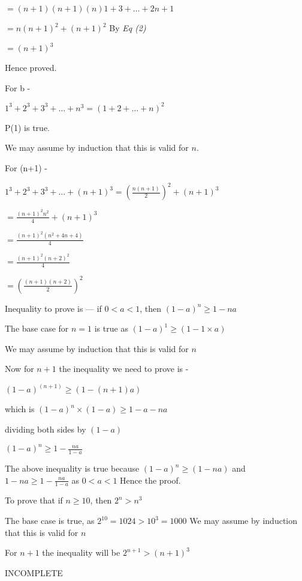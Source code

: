 \documentclass[12pt]{article}
\begin{document}
\begin{enumerate}
\begin{item}
      $ = (n+1)(n+1)(n) 1 + 3 + \dots + 2n+1 $
      
      $ = n(n+1)^{2} + (n+1)^2$ By {\it Eq (2)}
      
      $ = (n+1)^3$

      Hence proved.

      For b -

      $1^3 + 2^3 + 3^3 + \ldots + n^3  = (1+2+\ldots+n)^2$

      P(1) is true.

      We may assume by induction that this is valid for $n$.

      For (n+1) -

      $ 1^3 + 2^3 + 3^3 + ... + (n+1)^3 = (\frac{n(n+1)}{2})^2 + (n+1)^3 $

      $= \frac{(n+1)^2n^2}{4} + (n+1)^3 $

      $= \frac{(n+1)^2(n^2 + 4n + 4)}{4}$

      $= \frac{(n+1)^2(n+2)^2}{4}$

      $ = (\frac{(n+1)(n+2)}{2})^2 $

  \end{item}

  \begin{item}
    Inequality to prove is --- if $0 < a < 1$, then $(1-a)^n \ge 1 - na $
    
    The base case for $n = 1 $ is true as $ (1-a)^{1} \ge (1- 1 \times a) $

    We may assume by induction that this is valid for $n$

    Now for $ n + 1 $ the inequality we need to prove is -
    \begin{center}
      $(1-a)^{(n+1)} \ge (1 - (n+1)a) $

      which is $(1-a)^{n} \times (1-a) \ge 1-a - na $

      dividing both sides by $(1-a)$

      $ (1-a)^n \ge 1 - \frac{na}{1-a}$

      The above inequality is true because $ (1-a)^n \ge (1 -na) $ and $1-na \ge 1 -  \frac{na}{1-a} $ as $0 < a < 1$
      Hence the proof.
     
    \end{center}
  \end{item}

  \begin{item}
    To prove that if $n \ge 10 $, then $2^n > n^3 $

    The base case is true, as $2^{10} = 1024 > 10^3 = 1000 $
    We may assume by induction that this is valid for $n$

    For $n + 1$ the inequality will be $2^{n+1} > (n+1)^3 $

    INCOMPLETE
    
  \end{item}
  
  
\end{enumerate}
\end{document}
